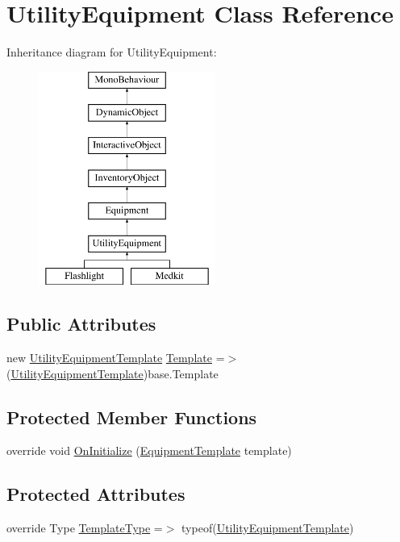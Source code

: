 \hypertarget{class_utility_equipment}{}\section{Utility\+Equipment Class Reference}
\label{class_utility_equipment}
Inheritance diagram for Utility\+Equipment\+:\begin{figure}[H]
\begin{center}
\leavevmode
\includegraphics[height=7.000000cm]{class_utility_equipment}
\end{center}
\end{figure}
\subsection*{Public Attributes}
\begin{DoxyCompactItemize}
\item 
new \mbox{\hyperlink{class_utility_equipment_template}{Utility\+Equipment\+Template}} \mbox{\hyperlink{class_utility_equipment_ac7962945d343430b5b3177d2f518e66d}{Template}} =$>$ (\mbox{\hyperlink{class_utility_equipment_template}{Utility\+Equipment\+Template}})base.\+Template
\end{DoxyCompactItemize}
\subsection*{Protected Member Functions}
\begin{DoxyCompactItemize}
\item 
override void \mbox{\hyperlink{class_utility_equipment_a1b8bbcd0b373613156c289e68fcc3a99}{On\+Initialize}} (\mbox{\hyperlink{class_equipment_template}{Equipment\+Template}} template)
\end{DoxyCompactItemize}
\subsection*{Protected Attributes}
\begin{DoxyCompactItemize}
\item 
override Type \mbox{\hyperlink{class_utility_equipment_ae2e6d381a30fd100e5e5a5147fd767ed}{Template\+Type}} =$>$ typeof(\mbox{\hyperlink{class_utility_equipment_template}{Utility\+Equipment\+Template}})
\end{DoxyCompactItemize}
